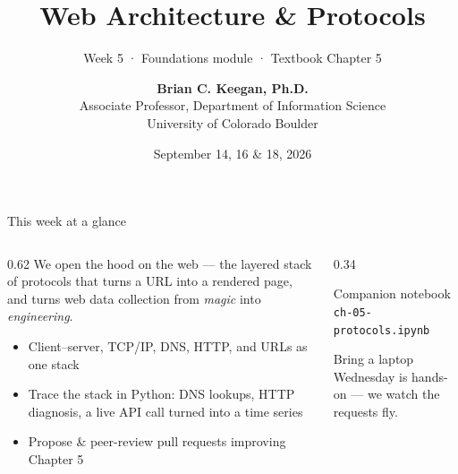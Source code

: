 \documentclass[9pt,aspectratio=169]{beamer}
\title[Week 5 · Protocols]{{\Huge Web Architecture \& Protocols}}
\subtitle{Week 5 · Foundations module · Textbook Chapter 5}
\author[Keegan]{\textbf{Brian C. Keegan, Ph.D.} \\ Associate Professor, Department of Information Science \\ University of Colorado Boulder}
\date{September 14, 16 \& 18, 2026}
\begin{document}
\maketitle

\begin{frame}{This week at a glance}
    \begin{columns}[T]
        \begin{column}{0.62\textwidth}
            We open the hood on the web --- the layered stack of protocols that turns a URL into a rendered page, and turns web data collection from \textit{magic} into \textit{engineering}.

            \vspace{1em}

            \begin{itemize}\small
                \item Client--server, TCP/IP, DNS, HTTP, and URLs as one stack
            \end{itemize}

            \vspace{0.5em}

            \begin{itemize}\small
                \item Trace the stack in Python: DNS lookups, HTTP diagnosis, a live API call turned into a time series
            \end{itemize}

            \vspace{0.5em}

            \begin{itemize}\small
                \item Propose \& peer-review pull requests improving Chapter 5
            \end{itemize}
        \end{column}
        \begin{column}{0.34\textwidth}
            \begin{block}{Companion notebook}
                \footnotesize \texttt{ch-05-protocols.ipynb}
            \end{block}
            \begin{alertblock}{Bring a laptop}
                \footnotesize Wednesday is hands-on --- we watch the requests fly.
            \end{alertblock}
        \end{column}
    \end{columns}
\end{frame}
\end{document}
